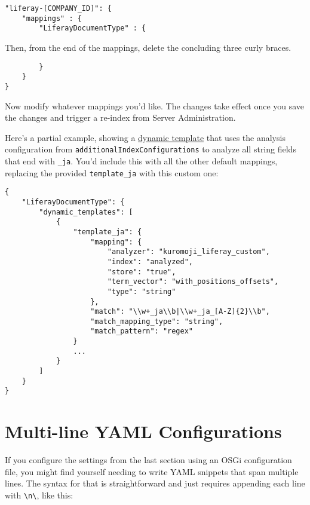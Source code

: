 \begin{verbatim}
"liferay-[COMPANY_ID]": {
    "mappings" : {
        "LiferayDocumentType" : {
\end{verbatim}

Then, from the end of the mappings, delete the concluding three curly
braces.

\begin{verbatim}
        }
    }
}
\end{verbatim}

Now modify whatever mappings you'd like. The changes take effect once
you save the changes and trigger a re-index from Server Administration.

Here's a partial example, showing a
\href{https://www.elastic.co/guide/en/elasticsearch/reference/7.x/dynamic-templates.html}{dynamic
template} that uses the analysis configuration from
\texttt{additionalIndexConfigurations} to analyze all string fields that
end with \texttt{\_ja}. You'd include this with all the other default
mappings, replacing the provided \texttt{template\_ja} with this custom
one:

\begin{verbatim}
{
    "LiferayDocumentType": {
        "dynamic_templates": [
            {
                "template_ja": {
                    "mapping": {
                        "analyzer": "kuromoji_liferay_custom",
                        "index": "analyzed",
                        "store": "true",
                        "term_vector": "with_positions_offsets",
                        "type": "string"
                    },
                    "match": "\\w+_ja\\b|\\w+_ja_[A-Z]{2}\\b",
                    "match_mapping_type": "string",
                    "match_pattern": "regex"
                }
                ...
            }
        ]
    }
}
\end{verbatim}

\section{Multi-line YAML
Configurations}\label{multi-line-yaml-configurations}

If you configure the settings from the last section using an OSGi
configuration file, you might find yourself needing to write YAML
snippets that span multiple lines. The syntax for that is
straightforward and just requires appending each line with
\texttt{\textbackslash{}n\textbackslash{}}, like this:

